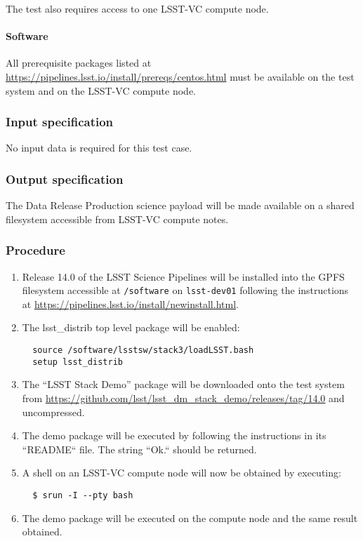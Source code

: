The test also requires access to one LSST-VC compute node.

\paragraph{Software}

All prerequisite packages listed at
\url{https://pipelines.lsst.io/install/prereqs/centos.html} must be available
on the test system and on the LSST-VC compute node.

\subsubsection{Input specification}

No input data is required for this test case.

\subsubsection{Output specification}

The Data Release Production science payload will be made available on a shared
filesystem accessible from LSST-VC compute notes.

\subsubsection{Procedure}

\begin{enumerate}

  \item{Release 14.0 of the LSST Science Pipelines will be installed into the
  GPFS filesystem accessible at \texttt{/software} on \texttt{lsst-dev01}
  following the instructions at
  \url{https://pipelines.lsst.io/install/newinstall.html}.}

  \item{The lsst\_distrib top level package will be enabled:

  \begin{verbatim}
  source /software/lsstsw/stack3/loadLSST.bash
  setup lsst_distrib
  \end{verbatim}
  }

  \item{The ``LSST Stack Demo'' package will be downloaded onto the test
  system from
  \url{https://github.com/lsst/lsst_dm_stack_demo/releases/tag/14.0} and
  uncompressed.}

  \item{The demo package will be executed by following the instructions in its
  ``README`` file. The string ``Ok.`` should be returned.}

  \item{A shell on an LSST-VC compute node will now be obtained by executing:

  \begin{verbatim}
  $ srun -I --pty bash
  \end{verbatim}
  }

  \item{The demo package will be executed on the compute node and the same
  result obtained.}

\end{enumerate}
